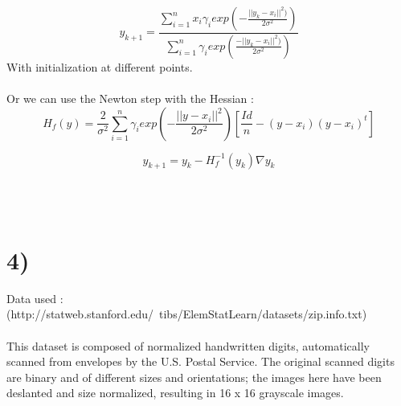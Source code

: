 $$y_{k+1}=\frac{\sum_{i=1}^{n}x_{i}\gamma_{i}exp(-\frac{||y_{k}-x_{i}||^{2})}{2\sigma^{2}})}{\sum_{i=1}^{n}\gamma_{i}exp(\frac{-||y_{k}-x_{i}||^{2})}{2\sigma^{2}})}$$
With initialization at different points.~\\
~\\
Or we can use the Newton step with the Hessian :
$$H_{f}(y)=\frac{2}{\sigma^{2}} \sum_{i=1}^{n}\gamma_{i}exp(-\frac{||y-x_{i}||^{2}}{2\sigma^{2}})[\frac{Id}{n}-(y-x_{i})(y-x_{i})^{t} ]$$

$$y_{k+1}=y_{k}-H_{f}^{-1}(y_{k})\nabla y_{k}$$

~\\
~\\
\section*{4)} Data used : (http://statweb.stanford.edu/~tibs/ElemStatLearn/datasets/zip.info.txt)
~\\
~\\
This dataset is composed of normalized handwritten digits, automatically scanned from envelopes by the U.S. Postal Service. The original
scanned digits are binary and of different sizes and orientations; the
images  here have been deslanted and size normalized, resulting
in 16 x 16 grayscale images.


